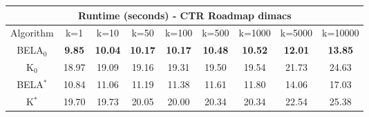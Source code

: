\begin{tabular}{c|cccccccc}\toprule
\multicolumn{9}{c}{Runtime (seconds) - CTR Roadmap dimacs}\\ \midrule
Algorithm & k=1 & k=10 & k=50 & k=100 & k=500 & k=1000 & k=5000 & k=10000 \\ \midrule
BELA$_0$ & \textbf{9.85} & \textbf{10.04} & \textbf{10.17} & \textbf{10.17} & \textbf{10.48} & \textbf{10.52} & \textbf{12.01} & \textbf{13.85} \\
K$_0$ & 18.97 & 19.09 & 19.16 & 19.31 & 19.50 & 19.54 & 21.73 & 24.63 \\
BELA$^*$ & 10.84 & 11.06 & 11.19 & 11.38 & 11.61 & 11.80 & 14.06 & 17.03 \\
K$^*$ & 19.70 & 19.73 & 20.05 & 20.00 & 20.34 & 20.34 & 22.54 & 25.38 \\ \bottomrule 
\end{tabular}
